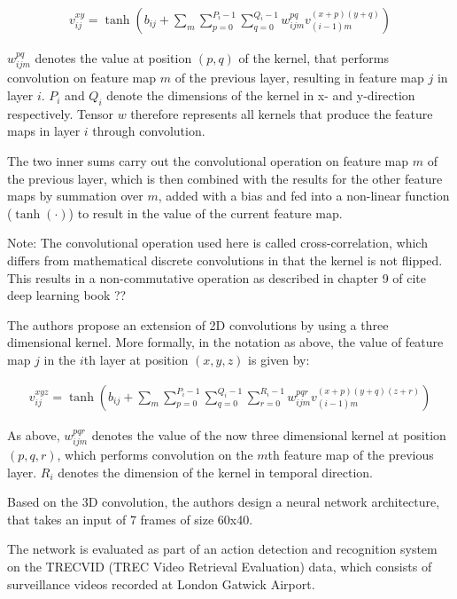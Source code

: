 \begin{align*}
    v_{ij}^{xy} = \tanh \left( b_{ij} + \sum_m \sum_{p=0}^{P_i -1} \sum_{q = 0}^{Q_i - 1} w_{ijm}^{pq} v_{(i-1)m}^{(x+p)(y+q)} \right)
\end{align*}

$w_{ijm}^{pq}$ denotes the value at position $(p,q)$ of the kernel, that performs convolution on feature map $m$ of the previous layer, resulting in feature map $j$ in layer $i$.
$P_i$ and $Q_i$ denote the dimensions of the kernel in x- and y-direction respectively.
Tensor $w$ therefore represents all kernels that produce the feature maps in layer $i$ through convolution.

The two inner sums carry out the convolutional operation on feature map $m$ of the previous layer, which is then combined with the results for the other feature maps by summation over $m$, added with a bias and fed into a non-linear function ($\tanh(\cdot)$) to result in the value of the current feature map.

Note: The convolutional operation used here is called cross-correlation, which differs from mathematical discrete convolutions in that the kernel is not flipped. This results in a non-commutative operation as described in chapter 9 of cite deep learning book ??

The authors propose an extension of 2D convolutions by using a three dimensional kernel. More formally, in the notation as above, the value of feature map $j$ in the $i$th layer at position $(x,y,z)$ is given by:

\begin{align*}
    v_{ij}^{xyz} = \tanh \left( b_{ij} + \sum_m \sum_{p=0}^{P_i -1} \sum_{q = 0}^{Q_i - 1} \sum_{r = 0}^{R_i - 1} w_{ijm}^{pqr} v_{(i-1)m}^{(x+p)(y+q)(z+r)} \right)
\end{align*}

As above, $w_{ijm}^{pqr}$ denotes the value of the now three dimensional kernel at position $(p,q,r)$, which performs convolution on the $m$th feature map of the previous layer.
$R_i$ denotes the dimension of the kernel in temporal direction. 

Based on the 3D convolution, the authors design a neural network architecture, that takes an input of 7 frames of size 60x40.

The network is evaluated as part of an action detection and recognition system on the TRECVID (TREC Video Retrieval Evaluation) data, which consists of surveillance videos recorded at London Gatwick Airport.

